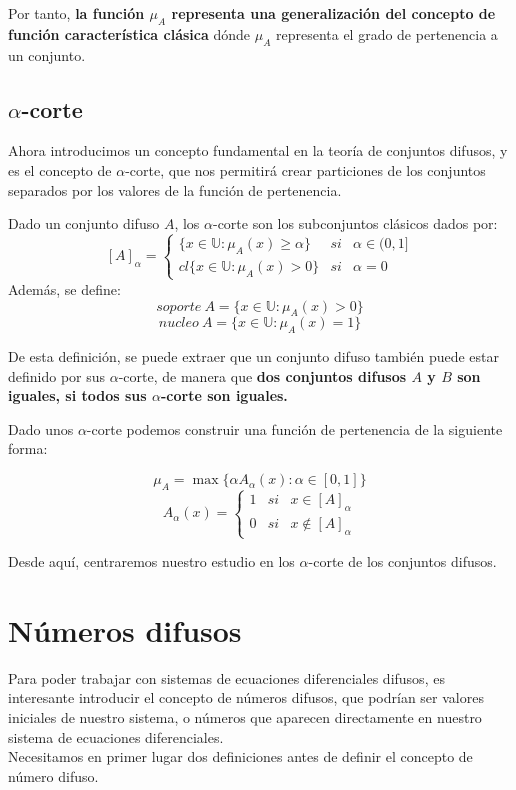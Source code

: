 Por tanto, \textbf{la función $\mu_A$ representa una generalización del concepto de función característica clásica} dónde $\mu_A$ representa el grado de pertenencia a un conjunto.

\subsection{$\alpha$-corte}
Ahora introducimos un concepto fundamental en la teoría de conjuntos difusos, y es el concepto de $\alpha$-corte, que nos permitirá crear particiones de los conjuntos separados por los valores de la función de pertenencia.
\begin{definicion}
	\label{def:alpha_corte}
	Dado un conjunto difuso $A$, los $\alpha$-corte son los subconjuntos clásicos dados por:
	\[
		[A]_\alpha = \left\{
			\begin{array}{ccc}
			\{x \in \mathbb{U} : \mu_A(x) \geq \alpha \} & si & \alpha \in (0, 1] \\
			cl\{x \in \mathbb{U} : \mu_A(x) > 0\} & si & \alpha=0
			\end{array}
		\right.
	\]
	Además, se define:
	\[
		soporte ~ A = \{x \in \mathbb{U} : \mu_A(x) > 0 \}
	\]
	\[
		nucleo ~ A = \{x \in \mathbb{U} : \mu_A(x) = 1 \}
	\]
\end{definicion}
De esta definición, se puede extraer que un conjunto difuso también puede estar definido por sus $\alpha$-corte, de manera que \textbf{dos conjuntos difusos $A$ y $B$ son iguales, si todos sus $\alpha$-corte son iguales.} 

Dado unos $\alpha$-corte podemos construir una función de pertenencia de la siguiente forma: \cite{apuntesfuzzy}

\[
	\mu_A = \max{\{\alpha A_\alpha(x) : \alpha \in [0, 1]}\}
\]
\[
	A_\alpha(x) = \left\{
		\begin{array}{ccc}
			1 & si & x \in [A]_\alpha \\
			0 & si & x \notin [A]_\alpha
		\end{array}
	\right.
\]

Desde aquí, centraremos nuestro estudio en los $\alpha$-corte de los conjuntos difusos.

\section{Números difusos}
Para poder trabajar con sistemas de ecuaciones diferenciales difusos, es interesante introducir el concepto de números difusos, que podrían ser valores iniciales de nuestro sistema, o números que aparecen directamente en nuestro sistema de ecuaciones diferenciales. \\
Necesitamos en primer lugar dos definiciones antes de definir el concepto de número difuso.

